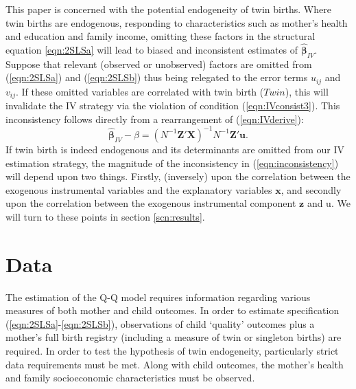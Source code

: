 \documentclass{article}[11pt,subeqn]
\newcommand{\vect}[1]{\mathbf{#1}}
\begin{document}
\begin{spacing}{1.25}
This paper is concerned 
with the potential endogeneity of twin births.  Where twin births are endogenous, responding to characteristics such as mother's 
health and education and family income, omitting these factors in the structural equation \ref{eqn:2SLSa} will lead to biased and 
inconsistent estimates of $\vect{\hat{\beta}}_{IV}$.  Suppose that relevant (observed or unobserved) factors are omitted from
(\ref{eqn:2SLSa}) and (\ref{eqn:2SLSb}) thus being relegated to the error terms $u_{ij}$ and $v_{ij}$.  If these omitted variables 
are correlated with twin birth ($Twin$), this will invalidate the IV strategy via the violation of condition (\ref{eqn:IVconsist3}).  This
inconsistency follows directly from a rearrangement of (\ref{eqn:IVderive}):
\begin{equation}
\label{eqn:inconsistency}
\vect{\hat{\beta}}_{IV}-\beta=(N^{-1}\vect{Z}'\vect{X})^{-1}N^{-1}\vect{Z}'\vect{u}.
\end{equation}
If twin birth is indeed endogenous and its determinants are omitted from our IV estimation strategy, the magnitude of the inconsistency in 
(\ref{eqn:inconsistency}) will depend upon two things.  Firstly, (inversely) upon the correlation between the exogenous instrumental
variables and the explanatory variables $\vect{x}$, and secondly upon the correlation between the exogenous instrumental component
$\vect{z}$ and u.  We will turn to these points in section \ref{scn:results}.

\section{Data}
\label{scn:data}
\vspace{-5mm}
The estimation of the Q-Q model requires information regarding various measures of both mother and child outcomes. In order to estimate specification (\ref{eqn:2SLSa}-\ref{eqn:2SLSb}), observations of child `quality' outcomes plus a mother's full birth registry (including a measure of twin or singleton births) are required.  In order to test the hypothesis of twin endogeneity, particularly strict data requirements must be met.  Along with child outcomes, the mother's health and family socioeconomic characteristics must be observed.


\end{spacing}
\end{document}
